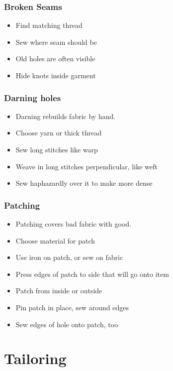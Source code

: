 \documentclass{beamer}
\begin{document}
\begin{frame}[fragile]
\tableofcontents[currentsection]
\end{frame}


\begin{frame}[fragile]
\frametitle{Broken Seams}
\begin{itemize}
\item Find matching thread
\item Sew where seam should be
\item Old holes are often visible
\item Hide knots inside garment
\end{itemize}
\end{frame}

\begin{frame}[fragile]
\frametitle{Darning holes}
\begin{itemize}
\item Darning rebuilds fabric by hand.
\item Choose yarn or thick thread
\item Sew long stitches like warp
\item Weave in long stitches perpendicular, like weft
\item Sew haphazardly over it to make more dense
\end{itemize}
\end{frame}

\begin{frame}[fragile]
\frametitle{Patching}
\begin{itemize}
\item Patching covers bad fabric with good.
\item Choose material for patch
\item Use iron on patch, or sew on fabric
\item Press edges of patch to side that will go onto item
\item Patch from inside or outside
\item Pin patch in place, sew around edges
\item Sew edges of hole onto patch, too
\end{itemize}
\end{frame}

\section{Tailoring}

\begin{frame}[fragile]
\tableofcontents[currentsection]
\end{frame}
\end{document}
